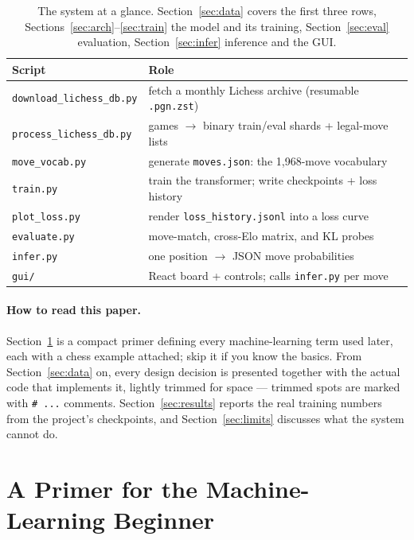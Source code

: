 \documentclass[10pt,a4paper]{article}
\newcommand{\code}[1]{\texttt{#1}}
\begin{document}
\begin{table}[htbp]
\centering
\small
\begin{tabular}{@{}ll@{}}
\toprule
\textbf{Script} & \textbf{Role} \\
\midrule
\verb|download_lichess_db.py| & fetch a monthly Lichess archive (resumable \code{.pgn.zst}) \\
\verb|process_lichess_db.py| & games $\rightarrow$ binary train/eval shards + legal-move lists \\
\verb|move_vocab.py| & generate \code{moves.json}: the 1{,}968-move vocabulary \\
\verb|train.py| & train the transformer; write checkpoints + loss history \\
\verb|plot_loss.py| & render \verb|loss_history.jsonl| into a loss curve \\
\verb|evaluate.py| & move-match, cross-Elo matrix, and KL probes \\
\verb|infer.py| & one position $\rightarrow$ JSON move probabilities \\
\verb|gui/| & React board + controls; calls \code{infer.py} per move \\
\bottomrule
\end{tabular}
\caption{The system at a glance. Section~\ref{sec:data} covers the first
three rows, Sections~\ref{sec:arch}--\ref{sec:train} the model and its
training, Section~\ref{sec:eval} evaluation, Section~\ref{sec:infer}
inference and the GUI.}
\label{tab:map}
\end{table}

\paragraph{How to read this paper.} Section~\ref{sec:primer} is a compact
primer defining every machine-learning term used later, each with a chess
example attached; skip it if you know the basics. From
Section~\ref{sec:data} on, every design decision is presented together
with the actual code that implements it, lightly trimmed for space ---
trimmed spots are marked with \code{\# ...} comments.
Section~\ref{sec:results} reports the real training numbers from the
project's checkpoints, and Section~\ref{sec:limits} discusses what the
system cannot do.

\section{A Primer for the Machine-Learning Beginner}\label{sec:primer}
\end{document}
